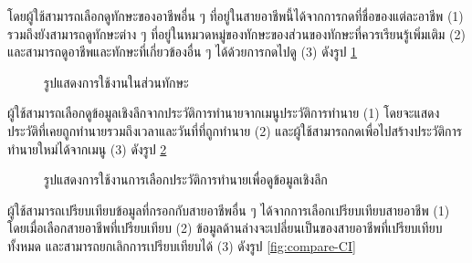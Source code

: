 โดยผู้ใช้สามารถเลือกดูทักษะของอาชีพอื่น ๆ ที่อยู่ในสายอาชีพนี้ได้จากการกดที่ชื่อของแต่ละอาชีพ (1) รวมถึงยังสามารถดูทักษะต่าง ๆ ที่อยู่ในหมวดหมู่ของทักษะของส่วนของทักษะที่ควรเรียนรู้เพิ่มเติม (2) และสามารถดูอาชีพและทักษะที่เกี่ยวข้องอื่น ๆ ได้ด้วยการกดไปดู (3) ดังรูป \ref{fig:skillaction-CI}
\begin{figure}[H]\centering
    \caption{รูปแสดงการใช้งานในส่วนทักษะ}\label{fig:skillaction-CI}
\end{figure}
ผู้ใช้สามารถเลือกดูข้อมูลเชิงลึกจากประวัติการทำนายจากเมนูประวัติการทำนาย (1) โดยจะแสดงประวัติที่เคยถูกทำนายรวมถึงเวลาและวันที่ที่ถูกทำนาย (2) และผู้ใช้สามารถกดเพื่อไปสร้างประวัติการทำนายใหม่ได้จากเมนู (3) ดังรูป \ref{fig:cardhistory-CI}
\begin{figure}[H]\centering
    \caption{รูปแสดงการใช้งานการเลือกประวัติการทำนายเพื่อดูข้อมูลเชิงลึก}\label{fig:cardhistory-CI}
\end{figure}
ผู้ใช้สามารถเปรียบเทียบข้อมูลที่กรอกกับสายอาชีพอื่น ๆ ได้จากการเลือกเปรียบเทียบสายอาชีพ (1) โดยเมื่อเลือกสายอาชีพที่เปรียบเทียบ (2) ข้อมูลด้านล่างจะเปลี่ยนเป็นของสายอาชีพที่เปรียบเทียบทั้งหมด และสามารถยกเลิกการเปรียบเทียบได้ (3) ดังรูป \ref{fig:compare-CI}
